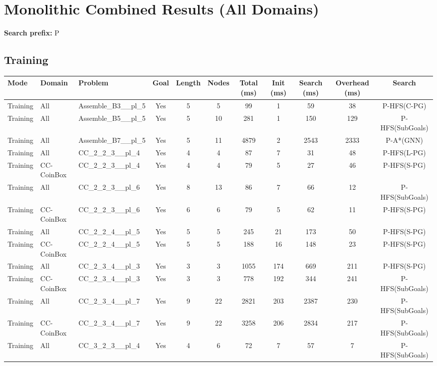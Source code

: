 \documentclass{article}
\begin{document}
\section*{Monolithic Combined Results (All Domains)}
\textbf{Search prefix:} P
\\[0.5cm]
\subsection*{Training}
\begin{tabular}{lllcccccccc}
\toprule
Mode & Domain & Problem & Goal & Length & Nodes & Total (ms) & Init (ms) & Search (ms) & Overhead (ms) & Search \\
\midrule
Training & All & Assemble\_B3\_\_pl\_5 & Yes & 5 & 5 & 99 & 1 & 59 & 38 & P-HFS(C-PG) \\
Training & All & Assemble\_B5\_\_pl\_5 & Yes & 5 & 10 & 281 & 1 & 150 & 129 & P-HFS(SubGoals) \\
Training & All & Assemble\_B7\_\_pl\_5 & Yes & 5 & 11 & 4879 & 2 & 2543 & 2333 & P-A*(GNN) \\
Training & All & CC\_2\_2\_3\_\_pl\_4 & Yes & 4 & 4 & 87 & 7 & 31 & 48 & P-HFS(L-PG) \\
Training & CC-CoinBox & CC\_2\_2\_3\_\_pl\_4 & Yes & 4 & 4 & 79 & 5 & 27 & 46 & P-HFS(S-PG) \\
Training & All & CC\_2\_2\_3\_\_pl\_6 & Yes & 8 & 13 & 86 & 7 & 66 & 12 & P-HFS(SubGoals) \\
Training & CC-CoinBox & CC\_2\_2\_3\_\_pl\_6 & Yes & 6 & 6 & 79 & 5 & 62 & 11 & P-HFS(S-PG) \\
Training & All & CC\_2\_2\_4\_\_pl\_5 & Yes & 5 & 5 & 245 & 21 & 173 & 50 & P-HFS(S-PG) \\
Training & CC-CoinBox & CC\_2\_2\_4\_\_pl\_5 & Yes & 5 & 5 & 188 & 16 & 148 & 23 & P-HFS(S-PG) \\
Training & All & CC\_2\_3\_4\_\_pl\_3 & Yes & 3 & 3 & 1055 & 174 & 669 & 211 & P-HFS(S-PG) \\
Training & CC-CoinBox & CC\_2\_3\_4\_\_pl\_3 & Yes & 3 & 3 & 778 & 192 & 344 & 241 & P-HFS(SubGoals) \\
Training & All & CC\_2\_3\_4\_\_pl\_7 & Yes & 9 & 22 & 2821 & 203 & 2387 & 230 & P-HFS(SubGoals) \\
Training & CC-CoinBox & CC\_2\_3\_4\_\_pl\_7 & Yes & 9 & 22 & 3258 & 206 & 2834 & 217 & P-HFS(SubGoals) \\
Training & All & CC\_3\_2\_3\_\_pl\_4 & Yes & 4 & 6 & 72 & 7 & 57 & 7 & P-HFS(SubGoals) \\

\end{tabular}
\end{document}
